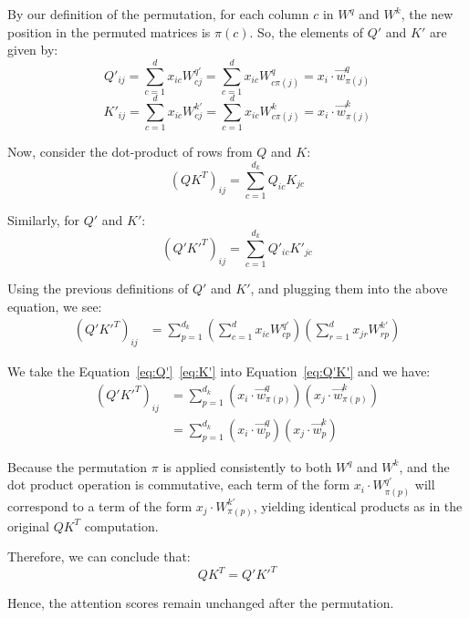 By our definition of the permutation, for each column $c$ in $W^q$ and $W^k$, the new position in the permuted matrices is $\pi(c)$. So, the elements of $Q'$ and $K'$ are given by:
\begin{equation}
    Q'_{ij} = \sum_{c=1}^{d} x_{ic} W^{q'}_{cj} = \sum_{c=1}^{d} x_{ic} W^{q}_{c\pi(j)} = x_i \cdot \Vec{w}^q_{\pi(j)}
    \label{eq:Q'}
\end{equation}
\begin{equation}
    K'_{ij} =  \sum_{c=1}^{d} x_{ic} W^{k'}_{cj} = \sum_{c=1}^{d} x_{ic} W^{k}_{c\pi(j)} = x_i \cdot \Vec{w}^k_{\pi(j)}
    \label{eq:K'}
\end{equation}


Now, consider the dot-product of rows from $Q$ and $K$:
\begin{equation}
    (QK^T)_{ij} = \sum_{c=1}^{d_k} Q_{ic} K_{jc} 
\end{equation}


Similarly, for $Q'$ and $K'$:
\begin{equation}
    (Q'K'^T)_{ij} = \sum_{c=1}^{d_k} Q'_{ic} K'_{jc}
\end{equation}


Using the previous definitions of $Q'$ and $K'$, and plugging them into the above equation, we see:
\begin{equation}
\begin{split}
\label{eq:Q'K'}
(Q'K'^T)_{ij} & = \sum_{p=1}^{d_k} \left( \sum_{c=1}^{d} x_{ic} W^{q'}_{cp} \right) \left( \sum_{r=1}^{d} x_{jr} W^{k'}_{rp} \right) 
\end{split}
\end{equation}

We take the Equation~\ref{eq:Q'}~\ref{eq:K'} into Equation~\ref{eq:Q'K'} and we have:
\begin{equation}\label{eq:Q'K'=QK}
\begin{split}
       (Q'K'^T)_{ij}  &= \sum_{p=1}^{d_k} \left( x_i \cdot \Vec{w}^q_{\pi(p)} \right) \left( x_j \cdot \Vec{w}^k_{\pi(p)} \right) 
       \\ &= \sum_{p=1}^{d_k} \left( x_i \cdot \Vec{w}^q_{p} \right) \left( x_j \cdot \Vec{w}^k_{p} \right) 
\end{split}
\end{equation}

Because the permutation $\pi$ is applied consistently to both $W^q$ and $W^k$, and the dot product operation is commutative, each term of the form $x_{i} \cdot W^{q'}_{\pi(p)}$ will correspond to a term of the form $x_{j} \cdot W^{k'}_{\pi(p)}$, yielding identical products as in the original $QK^T$ computation.

Therefore, we can conclude that:
\[ QK^T = Q'K'^T \]

Hence, the attention scores remain unchanged after the permutation.
